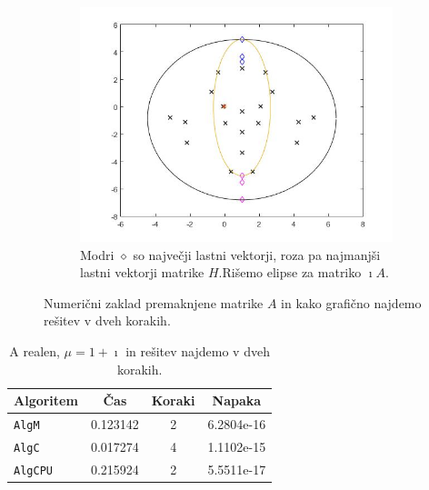 \documentclass[12pt,a4paper]{amsart}
\theoremstyle{definition}
\theoremstyle{plain}
\begin{document}
\begin{figure}[H]
\begin{subfigure}[t]{0.5\textwidth}
\includegraphics[width=0.9\linewidth]{RC2e2.jpg}
\caption{Modri $\diamond$ so največji lastni vektorji, roza pa najmanjši lastni vektorji matrike $H$.\footnotemark[\value{footnote}] Rišemo elipse za matriko $\imath A$.}
\label{fig:p43}
\end{subfigure}
\caption{Numerični zaklad premaknjene matrike $A$ in kako grafično najdemo rešitev v dveh korakih.}
\end{figure}

\begin{table}[H]
\caption{A realen, $\mu = 1 + \imath$ in rešitev najdemo v dveh korakih.}
\begin{tabular}{|l|c|c|c|}
\hline
Algoritem & Čas & Koraki & Napaka\\
\hline
\hline
\verb+AlgM+ &0.123142&2&6.2804e-16\\
\hline
\verb+AlgC+ &0.017274 &4 &1.1102e-15 \\
\hline
\verb+AlgCPU+ &0.215924&2&5.5511e-17\\
\hline
\end{tabular}

\label{t4}
\end{table}
\end{document}
